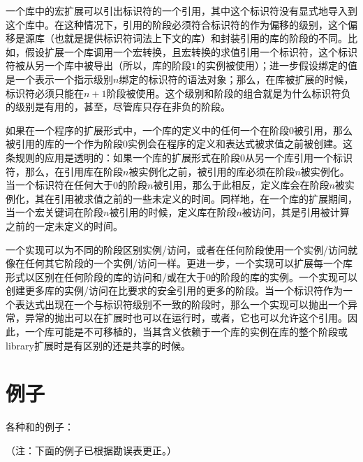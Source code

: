 一个库中的宏扩展可以引出标识符的一个引用，其中这个标识符没有显式地导入到这个库中。在这种情况下，引用的阶段必须符合标识符的作为偏移的级别，这个偏移是源库（也就是提供标识符词法上下文的库）和封装引用的库的阶段的不同。比如，假设扩展一个库调用一个宏转换，且宏转换的求值引用一个标识符，这个标识符被从另一个库中被导出（所以，库的阶段$1$的实例被使用）；进一步假设绑定的值是一个表示一个指示级别$n$绑定的标识符的语法对象；那么，在库被扩展的时候，标识符必须只能在$n+1$阶段被使用。这个级别和阶段的组合就是为什么标识符负的级别是有用的，甚至，尽管库只存在非负的阶段。

如果在一个程序的扩展形式中，一个库的定义中的任何一个在阶段$0$被引用，那么被引用的库的一个作为阶段$0$实例会在程序的定义和表达式被求值之前被创建。这条规则的应用是透明的：如果一个库的扩展形式在阶段$0$从另一个库引用一个标识符，那么，在引用库在阶段$n$被实例化之前，被引用的库必须在阶段$n$被实例化。当一个标识符在任何大于$0$的阶段$n$被引用，那么于此相反，定义库会在阶段$n$被实例化，其在引用被求值之前的一些未定义的时间。同样地，在一个库的扩展期间，当一个宏关键词在阶段$n$被引用的时候，定义库在阶段$n$被访问，其是引用被计算之前的一定未定义的时间。

一个实现可以为不同的阶段区别实例/访问，或者在任何阶段使用一个实例/访问就像在任何其它阶段的一个实例/访问一样。更进一步，一个实现可以扩展每一个{\cf 库}形式以区别在任何阶段的库的访问和/或在大于$0$的阶段的库的实例。一个实现可以创建更多库的实例/访问在比要求的安全引用的更多的阶段。当一个标识符作为一个表达式出现在一个与标识符级别不一致的阶段时，那么一个实现可以抛出一个异常，异常的抛出可以在扩展时也可以在运行时，或者，它也可以允许这个引用。因此，一个库可能是不可移植的，当其含义依赖于一个库的实例在库的整个阶段或{\cf library}扩展时是有区别的还是共享的时候。

\section{例子}

各种和的例子：

（注：下面的例子已根据勘误表更正。）


